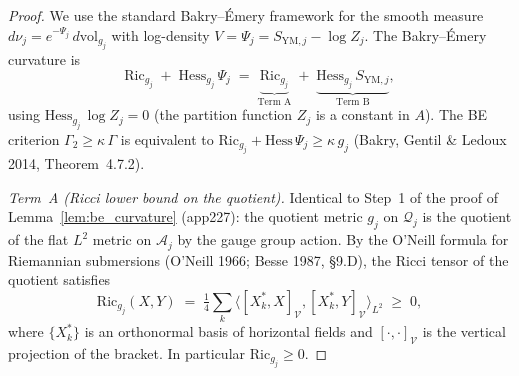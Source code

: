 \begin{proof}
We use the standard Bakry--\'Emery framework for the smooth
measure $d\nu_{j}=e^{-\Psi_{j}}\,d\mathrm{vol}_{g_{j}}$ with
log-density $V=\Psi_{j}=S_{\mathrm{YM},j}-\log Z_{j}$. The
Bakry--\'Emery curvature is
\begin{equation}
\label{eq:be_curvature_split}
  \mathrm{Ric}_{g_{j}}\;+\;\mathrm{Hess}_{g_{j}}\,\Psi_{j}
  \;=\;\underbrace{\mathrm{Ric}_{g_{j}}}_{\text{Term~A}}
  \;+\;\underbrace{\mathrm{Hess}_{g_{j}}\,S_{\mathrm{YM},j}}
  _{\text{Term~B}},
\end{equation}
using $\mathrm{Hess}_{g_{j}}\,\log Z_{j}=0$ (the partition
function $Z_{j}$ is a constant in $A$). The BE criterion
$\Gamma_{2}\ge\kappa\,\Gamma$ is equivalent to
$\mathrm{Ric}_{g_{j}}+\mathrm{Hess}\,\Psi_{j}\ge\kappa\,g_{j}$
(Bakry, Gentil \& Ledoux 2014, Theorem~4.7.2).

\emph{Term~A (Ricci lower bound on the quotient).} Identical to
Step~1 of the proof of Lemma~\ref{lem:be_curvature} (app227):
the quotient metric $g_{j}$ on $\mathcal{Q}_{j}$ is the quotient
of the flat $L^{2}$ metric on $\mathcal{A}_{j}$ by the gauge
group action. By the O'Neill formula for Riemannian
submersions (O'Neill 1966; Besse 1987, \S 9.D), the Ricci
tensor of the quotient satisfies
\begin{equation*}
  \mathrm{Ric}_{g_{j}}(X,Y)
  \;=\;\tfrac{1}{4}\sum_{k}
  \langle[X_{k}^{*},X]_{\mathcal{V}},[X_{k}^{*},Y]_{\mathcal{V}}
  \rangle_{L^{2}}\;\ge\;0,
\end{equation*}
where $\{X_{k}^{*}\}$ is an orthonormal basis of horizontal
fields and $[\cdot,\cdot]_{\mathcal{V}}$ is the vertical
projection of the bracket. In particular $\mathrm{Ric}_{g_{j}}\ge
0$.


\end{proof}
